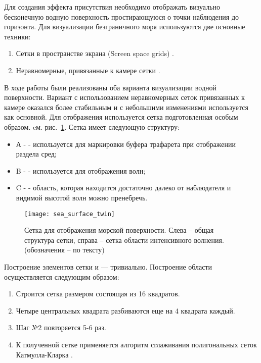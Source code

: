 Для создания эффекта присутствия необходимо отображать визуально бесконечную водную поверхность простирающуюся о точки наблюдения до горизонта. Для визуализации безграничного моря используются две основные техники:

\begin{enumerate}
	\item	Сетки в пространстве экрана (Screen space grids) \citep{projgrid}.
	\item	Неравномерные, привязанные к камере сетки \cite{crysis}.
\end{enumerate}

В ходе работы были реализованы оба варианта визуализации водной поверхности. Вариант с использованием неравномерных сеток привязанных к камере оказался более стабильным и с небольшими изменениями используется как основной.
Для отображения используется сетка подготовленная особым образом. cм. рис.~\ref{sea_surface_twin}. Сетка имеет следующую структуру: 

\begin{itemize}
	\item	А -  - используется для маркировки буфера трафарета при отображении раздела сред; 
	\item	B -  - используется для отображения волн; 
	\item	C -  - область, которая находится достаточно далеко от наблюдателя и видимой высотой волн можно пренебречь.
\end{itemize}

\begin{figure}[ht]
\begin{center}
\texttt{[image: sea\_surface\_twin]}
\end{center}
\caption{Сетка для отображения морской поверхности. Слева – общая структура сетки, справа – сетка области интенсивного волнения. (обозначения – по тексту)}
\label{sea_surface_twin}
\end{figure}

Построение элементов сетки  и  --- тривиально. Построение области  осуществляется следующим образом:
\begin{enumerate}
	\item	Строится сетка размером состоящая из 16 квадратов.
	\item	Четыре центральных квадрата разбиваются еще на 4 квадрата каждый.
	\item	Шаг №2 повторяется 5-6 раз.
	\item 	К полученной сетке применяется алгоритм сглаживания полигональных сеток Катмулла-Кларка \citep{catmull_clark}.
\end{enumerate}

